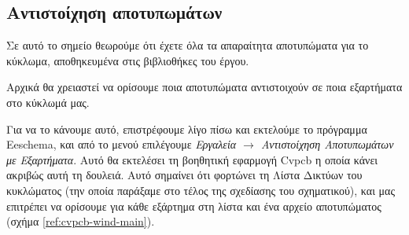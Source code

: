 \documentclass[a4paper]{article}
\begin{document}

\subsection{Αντιστοίχηση αποτυπωμάτων}
Σε αυτό το σημείο θεωρούμε ότι έχετε όλα τα απαραίτητα αποτυπώματα για το κύκλωμα, αποθηκευμένα στις βιβλιοθήκες του έργου.

Αρχικά θα χρειαστεί να ορίσουμε ποια αποτυπώματα αντιστοιχούν σε ποια εξαρτήματα στο κύκλωμά μας. 

Για να το κάνουμε αυτό, επιστρέφουμε λίγο πίσω και εκτελούμε το πρόγραμμα Eeschema, και από το μενού επιλέγουμε \textit{Εργαλεία $\rightarrow$ Αντιστοίχηση Αποτυπωμάτων με Εξαρτήματα}. Αυτό θα εκτελέσει τη βοηθητική εφαρμογή \textenglish{Cvpcb} η οποία κάνει ακριβώς αυτή τη δουλειά. Αυτό σημαίνει ότι φορτώνει τη Λίστα Δικτύων του κυκλώματος (την οποία παράξαμε στο τέλος της σχεδίασης του σχηματικού), και μας επιτρέπει να ορίσουμε για κάθε εξάρτημα στη λίστα και ένα αρχείο αποτυπώματος (σχήμα \ref{ref:cvpcb-wind-main}).
\end{document}
